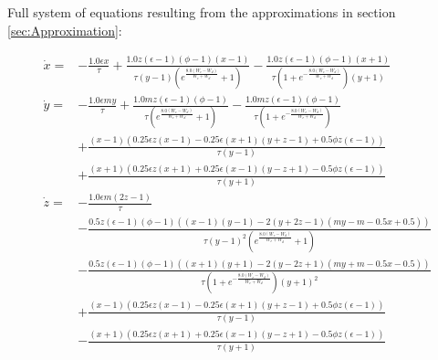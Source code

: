 \recalctypearea

Full system of equations resulting from the approximations in section \cref{sec:Approximation}:

\begin{align*}
  \dot{x} = &- \frac{1.0 \epsilon x}{\tau} + \frac{1.0 z \left(\epsilon - 1\right) \left(\phi - 1\right) \left(x - 1\right)}{\tau \left(y - 1\right) \left(e^{\frac{8.0 \left(W_{c} - W_{d}\right)}{W_{c} + W_{d}}} + 1\right)} - \frac{1.0 z \left(\epsilon - 1\right) \left(\phi - 1\right) \left(x + 1\right)}{\tau \left(1 + e^{- \frac{8.0 \left(W_{c} - W_{d}\right)}{W_{c} + W_{d}}}\right) \left(y + 1\right)} \\
%
  \dot{y} = &- \frac{1.0 \epsilon m y}{\tau} + \frac{1.0 m z \left(\epsilon - 1\right) \left(\phi - 1\right)}{\tau \left(e^{\frac{8.0 \left(W_{c} - W_{d}\right)}{W_{c} + W_{d}}} + 1\right)} - \frac{1.0 m z \left(\epsilon - 1\right) \left(\phi - 1\right)}{\tau \left(1 + e^{- \frac{8.0 \left(W_{c} - W_{d}\right)}{W_{c} + W_{d}}}\right)} \\
    & + \frac{\left(x - 1\right) \left(0.25 \epsilon z \left(x - 1\right) - 0.25 \epsilon \left(x + 1\right) \left(y + z - 1\right) + 0.5 \phi z \left(\epsilon - 1\right)\right)}{\tau \left(y - 1\right)} \\
    & + \frac{\left(x + 1\right) \left(0.25 \epsilon z \left(x + 1\right) + 0.25 \epsilon \left(x - 1\right) \left(y - z + 1\right) - 0.5 \phi z \left(\epsilon - 1\right)\right)}{\tau \left(y + 1\right)}\\
%
    \dot{z} = &- \frac{1.0 \epsilon m \left(2 z - 1\right)}{\tau} \\
    &- \frac{0.5 z \left(\epsilon - 1\right) \left(\phi - 1\right) \left(\left(x - 1\right) \left(y - 1\right) - 2 \left(y + 2 z - 1\right) \left(m y - m - 0.5 x + 0.5\right)\right)}{\tau \left(y - 1\right)^{2} \left(e^{\frac{8.0 \left(W_{c}-W_{d}\right)}{W_{c} + W_{d}}} + 1\right)} \\
    & - \frac{0.5 z \left(\epsilon - 1\right) \left(\phi - 1\right) \left(\left(x + 1\right) \left(y + 1\right) - 2 \left(y - 2 z + 1\right) \left(m y + m - 0.5 x - 0.5\right)\right)}{\tau \left(1 + e^{- \frac{8.0 \left(W_{c} - W_{d}\right)}{W_{c} + W_{d}}}\right) \left(y + 1\right)^{2}} \\
    & + \frac{\left(x - 1\right) \left(0.25 \epsilon z \left(x - 1\right) - 0.25 \epsilon \left(x + 1\right) \left(y + z - 1\right) + 0.5 \phi z \left(\epsilon - 1\right)\right)}{\tau \left(y - 1\right)} \\
    & - \frac{\left(x + 1\right) \left(0.25 \epsilon z \left(x + 1\right) + 0.25 \epsilon \left(x - 1\right) \left(y - z + 1\right) - 0.5 \phi z \left(\epsilon - 1\right)\right)}{\tau \left(y + 1\right)}
  \end{align*}
%

